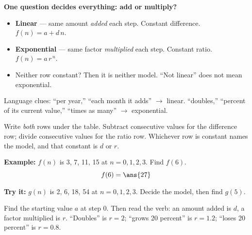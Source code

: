 \documentclass[12pt]{article}
\begin{document}

\begin{formulabox}
\textbf{One question decides everything: add or multiply?}
\begin{itemize}[leftmargin=0.9cm, itemsep=1pt, topsep=1pt]
\item \textbf{Linear} --- same amount \emph{added} each step. Constant
difference. $f(n) = a + d\,n$.
\item \textbf{Exponential} --- same factor \emph{multiplied} each step. Constant
ratio. $f(n) = a\,r^{\,n}$.
\item Neither row constant? Then it is neither model. ``Not linear'' does not
mean exponential.
\end{itemize}
Language clues: ``per year,'' ``each month it adds'' $\to$ linear. ``doubles,''
``percent of its current value,'' ``times as many'' $\to$ exponential.
\end{formulabox}


\begin{formulabox}
Write \emph{both} rows under the table. Subtract consecutive values for the
difference row; divide consecutive values for the ratio row. Whichever row is
constant names the model, and that constant is $d$ or $r$.
\end{formulabox}

\begin{examplebox}
\textbf{Example:} $f(n)$ is 3, 7, 11, 15 at $n = 0, 1, 2, 3$. Find $f(6)$.
\[ f(6) = \ans{27} \]
\end{examplebox}

\begin{tryitbox}
\textbf{Try it:} $g(n)$ is 2, 6, 18, 54 at $n = 0, 1, 2, 3$. Decide the model,
then find $g(5)$.\\[2pt]
\end{tryitbox}


\begin{formulabox}
Find the starting value $a$ at step 0. Then read the verb: an amount added is
$d$, a factor multiplied is $r$. ``Doubles'' is $r = 2$; ``grows 20 percent'' is
$r = 1.2$; ``loses 20 percent'' is $r = 0.8$.
\end{formulabox}
\end{document}
